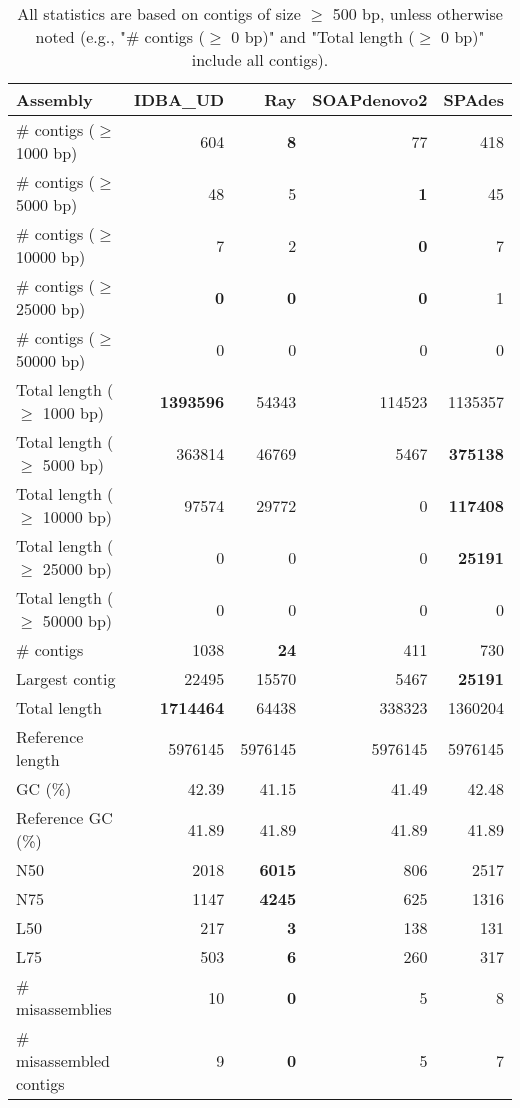 \documentclass[12pt,a4paper]{article}
\begin{document}
\begin{table}[ht]
\begin{center}
\caption{All statistics are based on contigs of size $\geq$ 500 bp, unless otherwise noted (e.g., "\# contigs ($\geq$ 0 bp)" and "Total length ($\geq$ 0 bp)" include all contigs).}
\begin{tabular}{|l*{4}{|r}|}
\hline
Assembly & IDBA\_UD & Ray & SOAPdenovo2 & SPAdes \\ \hline
\# contigs ($\geq$ 1000 bp) & 604 & {\bf 8} & 77 & 418 \\ \hline
\# contigs ($\geq$ 5000 bp) & 48 & 5 & {\bf 1} & 45 \\ \hline
\# contigs ($\geq$ 10000 bp) & 7 & 2 & {\bf 0} & 7 \\ \hline
\# contigs ($\geq$ 25000 bp) & {\bf 0} & {\bf 0} & {\bf 0} & 1 \\ \hline
\# contigs ($\geq$ 50000 bp) & 0 & 0 & 0 & 0 \\ \hline
Total length ($\geq$ 1000 bp) & {\bf 1393596} & 54343 & 114523 & 1135357 \\ \hline
Total length ($\geq$ 5000 bp) & 363814 & 46769 & 5467 & {\bf 375138} \\ \hline
Total length ($\geq$ 10000 bp) & 97574 & 29772 & 0 & {\bf 117408} \\ \hline
Total length ($\geq$ 25000 bp) & 0 & 0 & 0 & {\bf 25191} \\ \hline
Total length ($\geq$ 50000 bp) & 0 & 0 & 0 & 0 \\ \hline
\# contigs & 1038 & {\bf 24} & 411 & 730 \\ \hline
Largest contig & 22495 & 15570 & 5467 & {\bf 25191} \\ \hline
Total length & {\bf 1714464} & 64438 & 338323 & 1360204 \\ \hline
Reference length & 5976145 & 5976145 & 5976145 & 5976145 \\ \hline
GC (\%) & 42.39 & 41.15 & 41.49 & 42.48 \\ \hline
Reference GC (\%) & 41.89 & 41.89 & 41.89 & 41.89 \\ \hline
N50 & 2018 & {\bf 6015} & 806 & 2517 \\ \hline
N75 & 1147 & {\bf 4245} & 625 & 1316 \\ \hline
L50 & 217 & {\bf 3} & 138 & 131 \\ \hline
L75 & 503 & {\bf 6} & 260 & 317 \\ \hline
\# misassemblies & 10 & {\bf 0} & 5 & 8 \\ \hline
\# misassembled contigs & 9 & {\bf 0} & 5 & 7 \\ \hline

\end{tabular}
\end{center}
\end{table}
\end{document}
